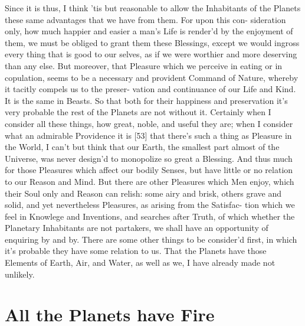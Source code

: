 \documentclass[letterpaper]{book}
\begin{document}
Since it is thus, I think 'tis but reasonable to allow the Inhabitants of
the Planets these same advantages that we have from them. For upon this con-
sideration only, how much happier and easier a man's Life is render'd by the
enjoyment of them, we must be obliged to grant them these Blessings, except
we would ingross every thing that is good to our selves, as if we were
worthier and more deserving than any else. But moreover, that Pleasure which
we perceive in eating or in copulation, seems to be a necessary and
provident Command of Nature, whereby it tacitly compels us to the preser-
vation and continuance of our Life and Kind. It is the same in Beasts. So
that both for their happiness and preservation it's very probable the rest
of the Planets are not without it. Certainly when I consider all these
things, how great, noble, and useful they are; when I consider what an
admirable Providence it is [53] that there's such a thing as Pleasure in the
World, I can't but think that our Earth, the smallest part almost of the
Universe, was never design'd to monopolize so great a Blessing. And thus
much for those Pleasures which affect our bodily Senses, but have little or
no relation to our Reason and Mind. But there are other Pleasures which Men
enjoy, which their Soul only and Reason can relish: some airy and brisk,
others grave and solid, and yet nevertheless Pleasures, as arising from the
Satisfac- tion which we feel in Knowlege and Inventions, and searches after
Truth, of which whether the Planetary Inhabitants are not partakers, we
shall have an opportunity of enquiring by and by.  There are some other
things to be consider'd first, in which it's probable they have some
relation to us. That the Planets have those Elements of Earth, Air, and
Water, as well as we, I have already made not unlikely.


\section{All the Planets have Fire}
\end{document}
